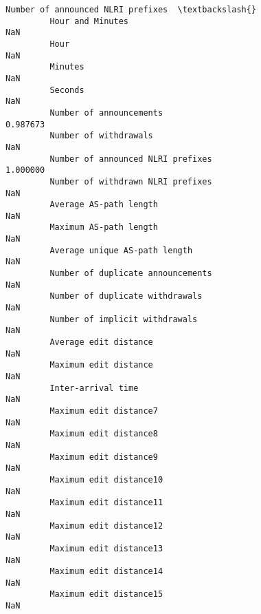 \documentclass[11pt]{article}
\begin{document}
\begin{Verbatim}[commandchars=\\\{\}]
                                                            Number of announced NLRI prefixes  \textbackslash{}
         Hour and Minutes                                                                 NaN   
         Hour                                                                             NaN   
         Minutes                                                                          NaN   
         Seconds                                                                          NaN   
         Number of announcements                                                     0.987673   
         Number of withdrawals                                                            NaN   
         Number of announced NLRI prefixes                                           1.000000   
         Number of withdrawn NLRI prefixes                                                NaN   
         Average AS-path length                                                           NaN   
         Maximum AS-path length                                                           NaN   
         Average unique AS-path length                                                    NaN   
         Number of duplicate announcements                                                NaN   
         Number of duplicate withdrawals                                                  NaN   
         Number of implicit withdrawals                                                   NaN   
         Average edit distance                                                            NaN   
         Maximum edit distance                                                            NaN   
         Inter-arrival time                                                               NaN   
         Maximum edit distance7                                                           NaN   
         Maximum edit distance8                                                           NaN   
         Maximum edit distance9                                                           NaN   
         Maximum edit distance10                                                          NaN   
         Maximum edit distance11                                                          NaN   
         Maximum edit distance12                                                          NaN   
         Maximum edit distance13                                                          NaN   
         Maximum edit distance14                                                          NaN   
         Maximum edit distance15                                                          NaN   

\end{Verbatim}
\end{document}
